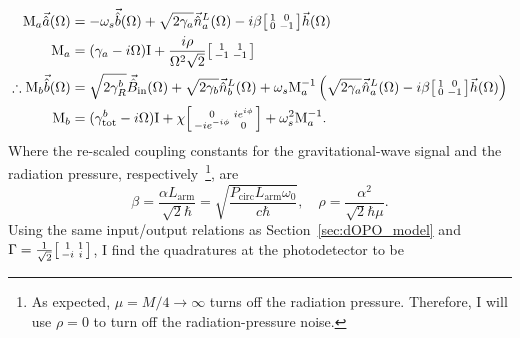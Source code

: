 \begin{align}
\text{M}_a\vec{\hat a}(\Omega)&=-\omega_s\vec{\hat b}(\Omega) + \sqrt{2\gamma_a}\vec{\hat n}^L_a(\Omega)-i\beta\begin{bsmallmatrix}1 & 0 \\0 & -1\end{bsmallmatrix}\vec h(\Omega) \\
\text{M}_a&= (\gamma_a-i \Omega)\text{I}+\frac{i \rho}{\Omega^2 \sqrt 2}\begin{bsmallmatrix}1 & 1 \\-1 & -1\end{bsmallmatrix} \\
\therefore\text{M}_b\vec{\hat b}(\Omega)&=\sqrt{2\gamma^b_R}\vec{\hat B}_\mathrm{in}(\Omega) + \sqrt{2\gamma_b}\vec{\hat n}^L_b(\Omega)+\omega_s \text{M}_a^{-1}\left(\sqrt{2\gamma_a}\vec{\hat n}^L_a(\Omega)-i\beta\begin{bsmallmatrix}1 & 0 \\0 & -1\end{bsmallmatrix}\vec h(\Omega)\right)\\
\text{M}_b&= (\gamma^b_\mathrm{tot}-i \Omega)\text{I}+\chi \begin{bsmallmatrix}0 & i e^{i\phi}\\-i e^{-i\phi} & 0\end{bsmallmatrix}+\omega_s^2\text{M}_a^{-1}.
\end{align}
Where the re-scaled coupling constants for the gravitational-wave signal and the radiation pressure, respectively~\footnote{As expected, $\mu=M/4\rightarrow\infty$ turns off the radiation pressure. Therefore, I will use $\rho=0$ to turn off the radiation-pressure noise.}, are
\begin{equation}\label{eq:beta_and_rho}
\beta = \frac{\alpha L_\mathrm{arm}}{\sqrt{2}\hbar}=\sqrt{\frac{ P_\text{circ}L_\text{arm} \omega_0 }{c  \hbar}},\quad \rho = \frac{\alpha^2}{\sqrt{2}\hbar\mu}.
\end{equation}
Using the same input/output relations as Section~\ref{sec:dOPO_model} and $\Gamma=\frac{1}{\sqrt2}\begin{bsmallmatrix}1 & 1 \\-i & i\end{bsmallmatrix}$, I find the quadratures at the photodetector to be
